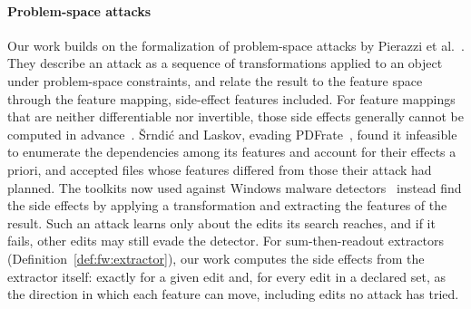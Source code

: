 
\paragraph{Problem-space attacks}
Our work builds on the formalization of problem-space attacks by Pierazzi et al.~\cite{pierazzi2020intriguing}. They
describe an attack as a sequence of transformations applied to an object under problem-space constraints, and relate the
result to the feature space through the feature mapping, side-effect features included. For feature mappings that are
neither differentiable nor invertible, those side effects generally cannot be computed in
advance~\cite{pierazzi2020intriguing}. Šrndić and Laskov, evading PDFrate~\cite{srndic2014practical}, found it
infeasible to enumerate the dependencies among its features and account for their effects a priori, and accepted files
whose features differed from those their attack had planned. The toolkits now used against Windows malware
detectors~\cite{demetrio2021adversarial,demetrio2021functionality,song2022mab} instead find the side effects by applying
a transformation and extracting the features of the result. Such an
attack learns only about the edits its search reaches, and if it fails, other edits may still evade the detector. For
sum-then-readout extractors (Definition~\ref{def:fw:extractor}), our work computes the side effects from the extractor
itself: exactly for a given edit and, for every edit in a declared set, as the direction in which each feature can move,
including edits no attack has tried.

